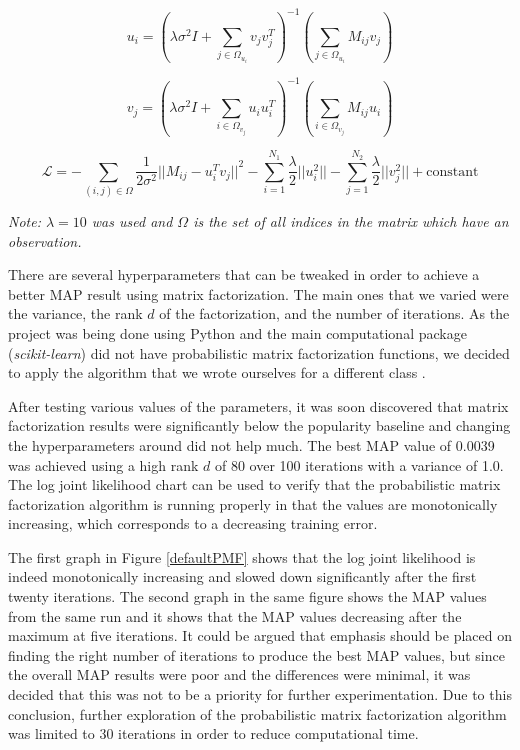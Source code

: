 \documentclass[11pt,preprint]{aastex}
\newcommand{\TRANSPOSE}{\ensuremath{T}}
\begin{document}
\begin{equation}
u_i = \left( \lambda\sigma^2 I + \sum_{j \in \Omega_{u_i}} v_j v_j^\TRANSPOSE \right)^{-1}\left(\sum_{j \in \Omega_{u_i}} M_{ij} v_{j} \right)
\label{eq1}
\end{equation}

\begin{equation}
v_j = \left( \lambda\sigma^2 I + \sum_{i \in \Omega_{v_j}} u_i u_i^\TRANSPOSE  \right)^{-1}\left(\sum_{i \in \Omega_{v_j}} M_{ij} u_{i} \right)
\label{eq2}
\end{equation}

\begin{equation}
\mathcal{L} = - \sum_{(i,j) \in \Omega} \frac{1}{2\sigma^2} {|| M_{ij} - u_i^\TRANSPOSE  v_j||}^2 - \sum_{i=1}^{N_1} \frac{\lambda}{2} ||u_i^2 || - \sum_{j=1}^{N_2} \frac{\lambda}{2} ||v_j^2 || + \text{constant}
\label{eq3} 
\end{equation}

\emph{Note: $\lambda = 10$ was used and $\Omega$ is the set of all indices in the matrix which have an observation.}

There are several hyperparameters that can be tweaked in order to achieve a better MAP result using matrix factorization. The main ones that we varied were the variance, the rank $d$ of the factorization, and the number of iterations. As the project was being done using Python and the main computational package (\emph{scikit-learn}) did not have probabilistic matrix factorization functions, we decided to apply the algorithm that we wrote ourselves for a different class \citep{koren2009matrix}. 
 
After testing various values of the parameters, it was soon discovered that matrix factorization results were significantly below the popularity baseline and changing the hyperparameters around did not help much. The best MAP value of 0.0039 was achieved using a high rank $d$ of 80 over 100 iterations with a variance of 1.0. The log joint likelihood chart can be used to verify that the probabilistic matrix factorization algorithm is running properly in that the values are monotonically increasing, which corresponds to a decreasing training error. 

The first graph in Figure \ref{defaultPMF} shows that the log joint likelihood is indeed monotonically increasing and slowed down significantly after the first twenty iterations. The second graph in the same figure shows the MAP values from the same run and it shows that the MAP values decreasing after the maximum at five iterations. It could be argued that emphasis should be placed on finding the right number of iterations to produce the best MAP values, but since the overall MAP results were poor and the differences were minimal, it was decided that this was not to be a priority for further experimentation. Due to this conclusion, further exploration of the probabilistic matrix factorization algorithm was limited to 30 iterations in order to reduce computational time.
\end{document}
